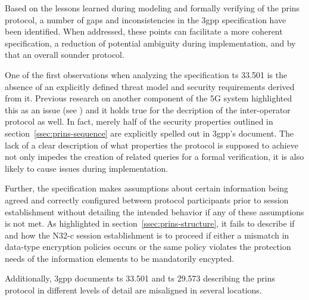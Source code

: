 Based on the lessons learned during modeling and formally verifying of the \gls{prins} protocol, a number of gaps and inconsistencies in the \gls{3gpp} specification have been identified.
When addressed, these points can facilitate a more coherent specification, a reduction of potential ambiguity during implementation, and by that an overall sounder protocol.

One of the first observations when analyzing the specification \gls{ts} 33.501 is the absence of an explicitly defined threat model and security requirements derived from it.
Previous research on another component of the 5G system highlighted this as an issue (see \cite{basin2018model}) and it holds true for the decription of the inter-operator protocol as well.
In fact, merely half of the security properties outlined in section~\ref{ssec:prins-sequence} are explicitly spelled out in \gls{3gpp}'s document.
The lack of a clear description of what properties the protocol is supposed to achieve not only impedes the creation of related queries for a formal verification, it is also likely to cause issues during implementation.

Further, the specification makes assumptions about certain information being agreed and correctly configured between protocol participants prior to session establishment without detailing the intended behavior if any of these assumptions is not met.
As highlighted in section~\ref{ssec:prins-structure}, it fails to describe if and how the N32-c session establishment is to proceed if either a mismatch in data-type encryption policies occurs or the same policy violates the protection needs of the information elements to be mandatorily encypted.

Additionally, \gls{3gpp} documents \gls{ts} 33.501 and \gls{ts} 29.573 describing the \gls{prins} protocol in different levels of detail are misaligned in several locations.

